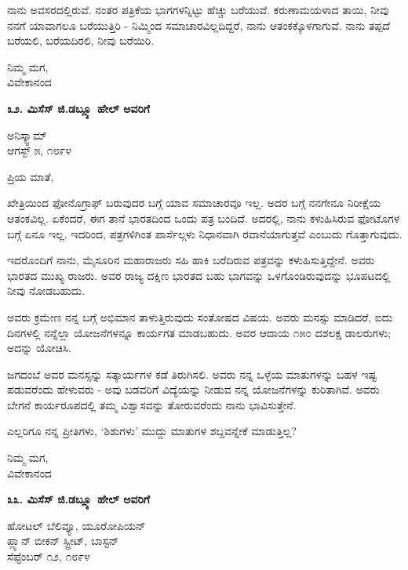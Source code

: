 ನಾನು ಅವಸರದಲ್ಲಿರುವೆ. ನಂತರ ಪತ್ರಿಕೆಯ ಭಾಗಗಳನ್ನಿಟ್ಟು ಹೆಚ್ಚು ಬರೆಯುವೆ. ಕರುಣಾಮಯಳಾದ ತಾಯಿ, ನೀವು ನನಗೆ ಯಾವಾಗಲೂ ಬರೆಯುತ್ತಿರಿ - ನಿಮ್ಮಿಂದ ಸಮಾಚಾರವಿಲ್ಲದಿದ್ದರೆ, ನಾನು ಆತಂಕಕ್ಕೊಳಗಾಗುವೆ. ನಾನು ತಪ್ಪದೆ ಬರೆಯಲಿ, ಬರೆಯದಿರಲಿ, ನೀವು ಬರೆಯಿರಿ.

\begin{flushright}
ನಿಮ್ಮ ಮಗ,\\ವಿವೇಕಾನಂದ
\end{flushright}

\begin{center}
\textbf{೩೨. ಮಿಸೆಸ್ ಜಿ.ಡಬ್ಲ್ಯೂ ಹೇಲ್ ಅವರಿಗೆ}
\end{center}

\begin{flushright}
ಅನಿಸ್ಕ್ವಾಮ್​\\ಆಗಸ್ಟ್ ೫, ೧೮೯೪
\end{flushright}

ಪ್ರಿಯ ಮಾತೆ,

ಖೇತ್ರಿಯಿಂದ ಫೋನೊಗ್ರಾಫ್ ಬರುವುದರ ಬಗ್ಗೆ ಯಾವ ಸಮಾಚಾರವೂ ಇಲ್ಲ. ಅದರ ಬಗ್ಗೆ ನನಗೇನೂ ನಿರೀಕ್ಷೆಯ ಆತಂಕವಿಲ್ಲ. ಏಕೆಂದರೆ, ಈಗ ತಾನೆ ಭಾರತದಿಂದ ಒಂದು ಪತ್ರ ಬಂದಿದೆ. ಅದರಲ್ಲಿ, ನಾನು ಕಳುಹಿಸಿರುವ ಫೋಟೊಗಳ ಬಗ್ಗೆ ಏನೂ ಇಲ್ಲ. ಇದರಿಂದ, ಪತ್ರಗಳಿಗಿಂತ ಪಾರ್ಸೆಲ್ಗಳು ನಿಧಾನವಾಗಿ ರವಾನೆಯಾಗುತ್ತವೆ ಎಂಬುದು ಗೊತ್ತಾಗುವುದು.

ಇದರೊಂದಿಗೆ ನಾನು, ಮೈಸೂರಿನ ಮಹಾರಾಜರು ಸಹಿ ಹಾಕಿ ಬರೆದಿರುವ ಪತ್ರವನ್ನು ಕಳುಹಿಸುತ್ತಿದ್ದೇನೆ. ಅವರು ಭಾರತದ ಮುಖ್ಯ ರಾಜರು. ಅವರ ರಾಜ್ಯ ದಕ್ಷಿಣ ಭಾರತದ ಬಹು ಭಾಗವನ್ನು ಒಳಗೊಂಡಿರುವುದನ್ನು ಭೂಪಟದಲ್ಲಿ ನೀವು ನೋಡಬಹುದು.

ಅವರು ಕ್ರಮೇಣ ನನ್ನ ಬಗ್ಗೆ ಅಭಿಮಾನ ತಾಳುತ್ತಿರುವುದು ಸಂತೋಷದ ವಿಷಯ. ಅವರು ಮನಸ್ಸು ಮಾಡಿದರೆ, ಐದು ದಿನಗಳಲ್ಲಿ ನನ್ನೆಲ್ಲಾ ಯೋಜನೆಗಳನ್ನೂ ಕಾರ್ಯಗತ ಮಾಡಬಹುದು. ಅವರ ಆದಾಯ ೧೫೦ ದಶಲಕ್ಷ ಡಾಲರುಗಳು; ಅದನ್ನು ಯೋಚಿಸಿ.

ಜಗದಂಬೆ ಅವರ ಮನಸ್ಸನ್ನು ಸತ್ಕಾರ್ಯಗಳ ಕಡೆ ತಿರುಗಿಸಲಿ. ಅವರು ನನ್ನ ಒಳ್ಳೆಯ ಮಾತುಗಳನ್ನು ಬಹಳ ಇಷ್ಟ ಪಡುವರೆಂದು ಹೇಳುವರು - ಅವು ಬಡವರಿಗೆ ವಿದ್ಯೆಯನ್ನು ನೀಡುವ ನನ್ನ ಯೋಜನೆಗಳನ್ನು ಕುರಿತಾಗಿವೆ. ಅವರು ಬೇಗನೆ ಕಾರ್ಯರೂಪದಲ್ಲಿ ತಮ್ಮ ವಿಶ್ವಾಸವನ್ನು ತೋರುವರೆಂದು ನಾನು ಭಾವಿಸುತ್ತೇನೆ.

ಎಲ್ಲರಿಗೂ ನನ್ನ ಪ್ರೀತಿಗಳು, ‘ಶಿಶುಗಳು’ ಮುದ್ದು ಮಾತುಗಳ ಶಬ್ದವನ್ನೇಕೆ ಮಾಡುತ್ತಿಲ್ಲ?

\begin{flushright}
ನಿಮ್ಮ ಮಗ,\\ವಿವೇಕಾನಂದ
\end{flushright}

\begin{center}
\textbf{೩೩. ಮಿಸೆಸ್ ಜಿ.ಡಬ್ಲ್ಯೂ ಹೇಲ್ ಅವರಿಗೆ}
\end{center}

\begin{flushright}
ಹೋಟಲ್ ಬೆಲಿವ್ಯೂ, ಯೂರೋಪಿಯನ್\\ಪ್ಲ್ಯಾನ್ ಬೀಕನ್ ಸ್ಟ್ರೀಟ್, ಬಾಸ್ಟನ್\\ಸೆಪ್ಟೆಂಬರ್ ೧೨, ೧೮೯೪
\end{flushright}

